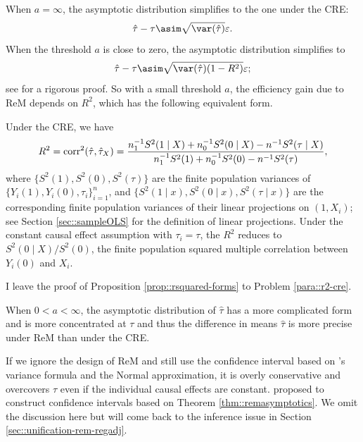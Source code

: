 When $a  = \infty$, the asymptotic distribution  simplifies to the one under the CRE:
$$
\hat{\tau} - \tau \asim \sqrt{ \var(\hat \tau) } \varepsilon .
$$
When the threshold $a$ is close to zero, the asymptotic distribution  simplifies to
$$
\hat{\tau} - \tau \asim \sqrt{ \var(\hat \tau) (1-R^2)} \varepsilon ;
$$
see \citet{wang2022rerandomization} for a rigorous proof.
So with a small threshold $a$, the efficiency gain due to ReM depends on $R^2$, which has the following equivalent form. 
\begin{proposition}
\label{prop::rsquared-forms}
Under the CRE, we have 
$$
R^2 = \textup{corr}^2(\hat{\tau}, \hat{\tau}_X   )
= \frac{  n_1^{-1}  S^2(1\mid X) + n_0^{-1} S^2(0\mid X) - n^{-1} S^2(\tau \mid X) }
{ n_1^{-1}  S^2( 1 ) + n_0^{-1} S^2( 0 ) - n^{-1} S^2( \tau  )},
$$
where $\{S^2( 1 ) , S^2( 0 ), S^2( \tau  )\}$ are the finite population variances of $\{ Y_i(1), Y_i(0), \tau_i \}_{i=1}^n$, and $\{S^2( 1 \mid x ) , S^2( 0 \mid x ), S^2( \tau  \mid x )\}$ are the corresponding finite population variances of their linear projections on $(1, X_i)$; see Section \ref{sec::sampleOLS} for the definition of linear projections. 
Under the constant causal effect assumption with $\tau_i = \tau$, the $R^2 $ reduces to $S^2(0\mid X) / S^2( 0 ) $, the finite population squared multiple correlation between $Y_i(0)$ and $X_i$.
\end{proposition}

I leave the proof of Proposition \ref{prop::rsquared-forms} to Problem \ref{para::r2-cre}. 

When $ 0 < a <\infty$, the asymptotic distribution of $\hat{\tau}$ has a more complicated form and is more concentrated at $\tau$ and thus the difference in means $\hat{\tau}$ is more precise under ReM than under the CRE. 


If we ignore the design of ReM and still use the confidence interval based on \cite{Neyman:1923}'s variance formula and the Normal approximation, it is overly conservative and overcovers $\tau$ even if the individual causal effects are constant. \citet{li2018asymptotic} proposed to construct confidence intervals based on Theorem \ref{thm::remasymptotics}. We omit the discussion here but will come back to the inference issue in Section \ref{sec::unification-rem-regadj}. 
 



